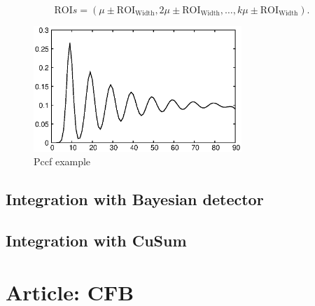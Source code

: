 \documentclass[doctoral,utf8,lot,loar,lof,shortloft,index]{jydiss}
\begin{document}
\begin{equation}\label{eq:rois}
	\text{ROI}s = (\mu \pm \text{ROI}_{\text{Width}}, 2 \mu \pm \text{ROI}_{\text{Width}}, \dots , k \mu \pm \text{ROI}_{\text{Width}}).
\end{equation}
\begin{figure}[!htb]
	\centering
	\includegraphics[width=0.7\textwidth]{images/example_pccf.eps}
	\caption{Pccf example}\label{fig:pccf_example}
\end{figure}



\section{Integration with Bayesian detector}
\section{Integration with CuSum}

\chapter{Article: CFB}

\end{document}
